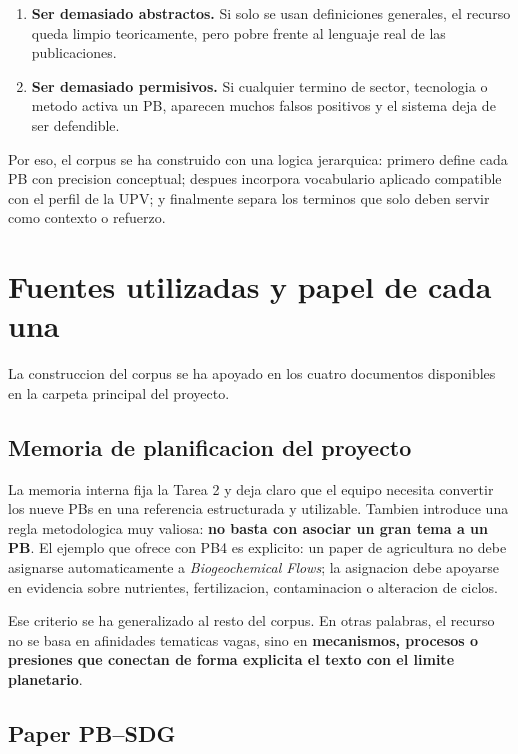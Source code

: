 \documentclass[11pt,a4paper]{article}
\begin{document}
\begin{enumerate}
\item \textbf{Ser demasiado abstractos.} Si solo se usan definiciones generales, el recurso queda limpio teoricamente, pero pobre frente al lenguaje real de las publicaciones.
\item \textbf{Ser demasiado permisivos.} Si cualquier termino de sector, tecnologia o metodo activa un PB, aparecen muchos falsos positivos y el sistema deja de ser defendible.
\end{enumerate}

Por eso, el corpus se ha construido con una logica jerarquica: primero define cada PB con precision conceptual; despues incorpora vocabulario aplicado compatible con el perfil de la UPV; y finalmente separa los terminos que solo deben servir como contexto o refuerzo.

\section{Fuentes utilizadas y papel de cada una}

La construccion del corpus se ha apoyado en los cuatro documentos disponibles en la carpeta principal del proyecto.

\subsection{Memoria de planificacion del proyecto}

La memoria interna fija la Tarea 2 y deja claro que el equipo necesita convertir los nueve PBs en una referencia estructurada y utilizable. Tambien introduce una regla metodologica muy valiosa: \textbf{no basta con asociar un gran tema a un PB}. El ejemplo que ofrece con PB4 es explicito: un paper de agricultura no debe asignarse automaticamente a \textit{Biogeochemical Flows}; la asignacion debe apoyarse en evidencia sobre nutrientes, fertilizacion, contaminacion o alteracion de ciclos.

Ese criterio se ha generalizado al resto del corpus. En otras palabras, el recurso no se basa en afinidades tematicas vagas, sino en \textbf{mecanismos, procesos o presiones que conectan de forma explicita el texto con el limite planetario}.

\subsection{Paper PB--SDG}
\end{document}

